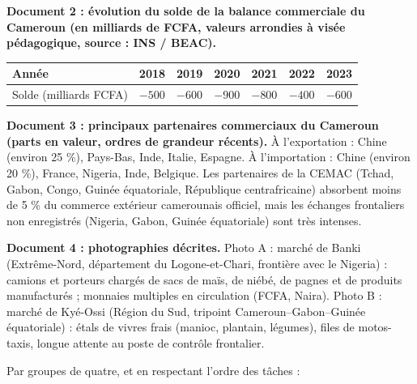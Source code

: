 \documentclass[11pt]{article}
\newcommand{\cle}[1]{{\popxbold\color{popdark}#1}}
\newcounter{popsec}
\newcounter{popsub}
\newcommand{\courssub}[1]{%
  \stepcounter{popsub}%
  \par\vspace{9pt}\noindent{\popxbold\fontsize{11.5}{13}\selectfont\color{popink}{\color{poporange}\thepopsec.\thepopsub}\hspace{6pt}#1}\par\nopagebreak\vspace{4pt}
}
\begin{document}
\textbf{Document 2 : évolution du solde de la balance commerciale du Cameroun (en milliards de FCFA, valeurs arrondies à visée pédagogique, source : INS / BEAC).}

\begin{center}
\begin{tabularx}{\linewidth}{|l|X|X|X|X|X|X|}\hline
\rowcolor{popblueL} \textbf{Année} & 2018 & 2019 & 2020 & 2021 & 2022 & 2023 \\ \hline
Solde (milliards FCFA) & $-500$ & $-600$ & $-900$ & $-800$ & $-400$ & $-600$ \\ \hline
\end{tabularx}
\end{center}

\textbf{Document 3 : principaux partenaires commerciaux du Cameroun (parts en valeur, ordres de grandeur récents).} À l'exportation : Chine (environ 25 \%), Pays-Bas, Inde, Italie, Espagne. À l'importation : Chine (environ 20 \%), France, Nigeria, Inde, Belgique. Les partenaires de la CEMAC (Tchad, Gabon, Congo, Guinée équatoriale, République centrafricaine) absorbent moins de 5 \% du commerce extérieur camerounais officiel, mais les échanges frontaliers non enregistrés (Nigeria, Gabon, Guinée équatoriale) sont très intenses.

\textbf{Document 4 : photographies décrites.} Photo A : marché de \cle{Banki} (Extrême-Nord, département du Logone-et-Chari, frontière avec le Nigeria) : camions et porteurs chargés de sacs de maïs, de niébé, de pagnes et de produits manufacturés ; monnaies multiples en circulation (FCFA, Naira). Photo B : marché de \cle{Kyé-Ossi} (Région du Sud, tripoint Cameroun--Gabon--Guinée équatoriale) : étals de vivres frais (manioc, plantain, légumes), files de motos-taxis, longue attente au poste de contrôle frontalier.

\courssub{Consignes}

Par groupes de quatre, et en respectant l'ordre des tâches :
\end{document}
